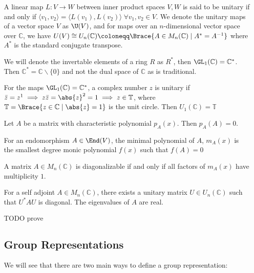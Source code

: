 \begin{defi}
	A linear map $L : V \to W$ between inner product spaces $V,W$ is said to be unitary if and only if $\langle v_1, v_2\rangle  = \langle L(v_1), L(v_2) \rangle\;\forall v_1,v_2 \in V$.
	We denote the unitary maps of a vector space $V$ as $\U(V)$, and for maps over an $n$-dimensional vector space over $\mathbb{C}$, we have $U(V) \cong U_n(\mathbb{C}) \coloneqq \Brace{A \in M_n(\mathbb{C}) \;\vert\; A^* = A^{-1}}$ where $A^*$ is the standard conjugate transpose.
\end{defi}

We will denote the invertable elements of a ring $R$ as $R^*$, then $\GL_1(\mathbb{C}) = \mathbb{C}^*$. Then $\mathbb{C}^* = \mathbb{C}\backslash \{0\}$ and not the dual space of $\mathbb{C}$ as is traditional.

\begin{exam}
	For the maps $\GL_1(\mathbb{C}) = \mathbb{C}^*$, a complex number $z$ is unitary if $\bar{z} = z^1 \implies z\bar{z} = \abs{z}^2 = 1 \implies z \in \mathbb{T}$, where $\mathbb{T} = \Brace{z \in \mathbb{C}\;\vert\;\abs{z} = 1}$ is the unit circle. Then $U_1(\mathbb{C}) = \mathbb{T}$
\end{exam}

\begin{theo}
	Let $A$ be a matrix with characteristic polynomial $p_A(x)$. Then $p_A(A) = 0$.
\end{theo}

\begin{defi}
	For an endomorphism $A \in \End(V)$, the minimal polynomial of $A$, $m_A(x)$ is the smallest degree monic polynomial $f(x)$ such that $f(A) = 0$
\end{defi}

\begin{theo}
	A matrix $A \in M_n(\mathbb{C})$ is diagonalizable if and only if all factors of $m_A(x)$ have multiplicity $1$.
\end{theo}

\begin{theo}
	For a self adjoint $A \in M_n(\mathbb{C})$, there exists a unitary matrix $U \in U_n(\mathbb{C})$ such that $U^* AU$ is diagonal. The eigenvalues of $A$ are real.
\end{theo}

TODO prove

\newpage
\subsection{Group Representations}
We will see that there are two main ways to define a group representation:

